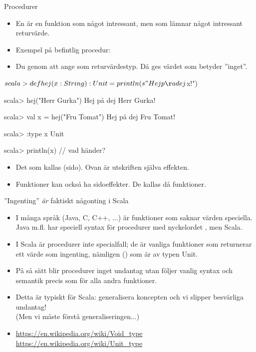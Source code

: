 \begin{Slide}{Procedurer}\SlideFontSmall
\begin{itemize}
\item En  är en funktion som  något intressant, men som  lämnar något intressant returvärde.
\item Exempel på befintlig procedur: 
\item Du  genom att ange \texttt{} som returvärdestyp. Då ges värdet \texttt{\Alert{()}} som betyder ''inget''.
\end{itemize}
\begin{REPLsmall}$%
scala> def hej(x: String): Unit = println(s"Hej på dej $x!")

scala> hej("Herr Gurka")
Hej på dej Herr Gurka!

scala> val x = hej("Fru Tomat")
Hej på dej Fru Tomat!

scala> :type x 
Unit

scala> println(x)    // vad händer?
\end{REPLsmall}
\begin{itemize}
\item Det som  kallas (sido). Ovan är utskriften själva effekten.
\item Funktioner kan också ha sidoeffekter. De kallas då  funktioner.
\end{itemize}
\end{Slide}

\begin{Slide}{''Ingenting'' \emph{är} faktiskt någonting i Scala}
\begin{itemize}
\item I många språk (Java, C, C++, ...) är funktioner som saknar värden speciella.
 Java m.fl. har speciell syntax för procedurer med nyckelordet , men  Scala.

\item I Scala är procedurer inte specialfall; de är vanliga funktioner som returnerar ett värde som  ingenting, nämligen () som är av typen Unit.

\item På så sätt blir procedurer inget undantag utan följer vanlig syntax och semantik precis som för alla andra funktioner.

\item Detta är typiskt för Scala: generalisera koncepten och vi slipper besvärliga undantag! \\(Men vi måste förstå generaliseringen...)


\item [] {\SlideFontSmall
\url{https://en.wikipedia.org/wiki/Void_type}
\url{https://en.wikipedia.org/wiki/Unit_type}
}

\end{itemize}

\end{Slide}

